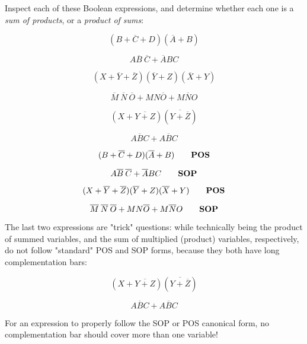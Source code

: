 

Inspect each of these Boolean expressions, and determine whether each one is a {\it sum of products}, or a {\it product of sums}:

$$(B + \overline{C} + D)(\overline{A} + B)$$

$$A\overline{B} \> \overline{C} + \overline{A}BC $$

$$(X + \overline{Y} + \overline{Z})(\overline{Y} + Z)(\overline{X} + Y)$$

$$\overline{M} \> \overline{N} \> \overline{O} + MN\overline{O} + M\overline{N}O$$

$$(X + \overline{Y + Z})(\overline{Y + \overline{Z}})$$

$$\overline{ABC} + A\overline{B}C$$







$$(B + \overline{C} + D)(\overline{A} + B) \hskip 20pt \hbox{\bf POS}$$

$$A\overline{B} \> \overline{C} + \overline{A}BC \hskip 20pt \hbox{\bf SOP}$$

$$(X + \overline{Y} + \overline{Z})(\overline{Y} + Z)(\overline{X} + Y) \hskip 20pt \hbox{\bf POS}$$

$$\overline{M} \> \overline{N} \> \overline{O} + MN\overline{O} + M\overline{N}O \hskip 20pt \hbox{\bf SOP}$$

The last two expressions are "trick" questions: while technically being the product of summed variables, and the sum of multiplied (product) variables, respectively, do not follow "standard" POS and SOP forms, because they both have long complementation bars:

$$(X + \overline{Y + Z})(\overline{Y + \overline{Z}})$$

$$\overline{ABC} + A\overline{B}C$$

For an expression to properly follow the SOP or POS canonical form, no complementation bar should cover more than one variable!







